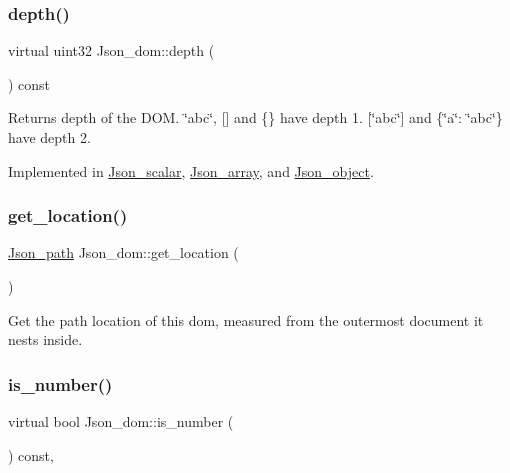 \subsubsection{\texorpdfstring{depth()}{depth()}}
{\footnotesize\ttfamily virtual uint32 Json\+\_\+dom\+::depth (\begin{DoxyParamCaption}{ }\end{DoxyParamCaption}) const\hspace{0.3cm}{\ttfamily [pure virtual]}}

\begin{DoxyReturn}{Returns}
depth of the D\+OM. \char`\"{}abc\char`\"{}, \mbox{[}\mbox{]} and \{\} have depth 1. \mbox{[}\char`\"{}abc\char`\"{}\mbox{]} and \{\char`\"{}a\char`\"{}\+: \char`\"{}abc\char`\"{}\} have depth 2. 
\end{DoxyReturn}


Implemented in \mbox{\hyperlink{classJson__scalar_aab92f03cf346f3239138e488a13254e7}{Json\+\_\+scalar}}, \mbox{\hyperlink{classJson__array_a2ab9cb0a7b55a817c9babb6a74b3922e}{Json\+\_\+array}}, and \mbox{\hyperlink{classJson__object_a639ad387120ba5bea5372896f6e30c38}{Json\+\_\+object}}.

\mbox{\label{classJson__dom_a9de13701bd441f8eee2a778cf400a936}} 
\subsubsection{\texorpdfstring{get\+\_\+location()}{get\_location()}}
{\footnotesize\ttfamily \mbox{\hyperlink{classJson__path}{Json\+\_\+path}} Json\+\_\+dom\+::get\+\_\+location (\begin{DoxyParamCaption}{ }\end{DoxyParamCaption})}

Get the path location of this dom, measured from the outermost document it nests inside. \mbox{\label{classJson__dom_ab94257c625c7d77556fd3bf58c961187}} 
\subsubsection{\texorpdfstring{is\+\_\+number()}{is\_number()}}
{\footnotesize\ttfamily virtual bool Json\+\_\+dom\+::is\+\_\+number (\begin{DoxyParamCaption}{ }\end{DoxyParamCaption}) const\hspace{0.3cm}{\ttfamily [inline]}, {\ttfamily [virtual]}}

